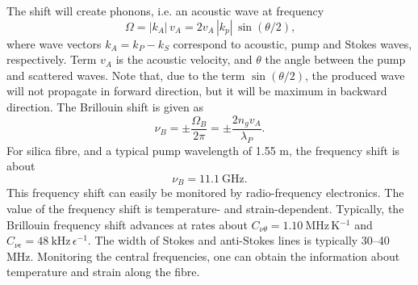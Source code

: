 \documentclass{standalone}
\begin{document}
The shift will create phonons, i.e. an acoustic wave at frequency
\begin{equation}
\Omega = \left|k_A\right| \, v_A = 2 v_A \, \left|k_p\right| \, \sin\left(\theta / 2 \right) \textrm{,}
\end{equation}
where wave vectors $k_A = k_P - k_S$ correspond to acoustic, pump and Stokes waves, respectively. Term $v_A$ is the acoustic velocity, and $\theta$ the angle between the pump and scattered waves. Note that, due to the term $\sin\left(\theta / 2\right)$, the produced wave will not propagate in forward direction, but it will be maximum in backward direction. The Brillouin shift is given as
\begin{equation}
\nu_B = \pm \frac{\Omega_B}{2 \pi} = \pm \frac{2 n_g v_A}{\lambda_P} \textrm{.}
\end{equation}
For silica fibre, and a typical pump wavelength of 1.55 \textmu m, the frequency shift is about 
\begin{equation}
\nu_B = \SI{11.1}{\giga \hertz} \textrm{.}
\end{equation}
This frequency shift can easily be monitored by radio-frequency electronics. The value of the frequency shift is temperature- and strain-dependent. Typically, the Brillouin frequency shift advances at rates about $C_{\nu\theta} = \SI{1.10}{\mega \hertz \, \kelvin^{-1}}$ and $C_{\nu\epsilon} = \SI{48}{\kilo \hertz \, \epsilon^{-1}}$. The width of Stokes and anti-Stokes lines is typically 30--40 MHz. Monitoring the central frequencies, one can obtain the information about temperature and strain along the fibre. \\
\end{document}
